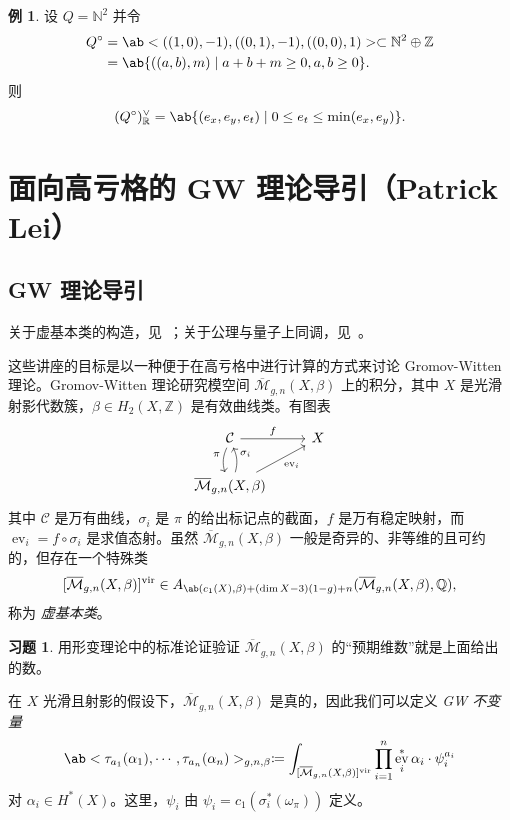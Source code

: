 \documentclass{amsart}
\theoremstyle{definition}
\newtheorem{exm}[thm]{例}
\newtheorem{exer}[thm]{习题}
\theoremstyle{remark}
\theoremstyle{plain}
\theoremstyle{definition}
\theoremstyle{remark}
\newcommand{\N}{\mathbb{N}}
\newcommand{\R}{\mathbb{R}}
\newcommand{\Z}{\mathbb{Z}}
\newcommand{\Q}{\mathbb{Q}}
\newcommand{\Mbar}{\overline{\mathcal{M}}}
\newcommand{\mc}[1]{\mathcal{#1}}
\newcommand{\mr}[1]{\mathrm{#1}}
\newcommand{\on}[1]{\operatorname{#1}}
\newcommand{\1}{\mathbf{1}}
\newcommand{\2}{\mathbf{2}}
\newcommand{\3}{\mathbf{3}}
\newcommand{\vir}{\mr{vir}}
\DeclareMathOperator{\ev}{ev}
\begin{document}
\begin{exm}
    设 \(Q = \N^2\) 并令
    \begin{align*}
        Q^{\circ} &= \ab<((1,0), -1), ((0,1), -1), ((0,0),1)> \subset \N^2 \oplus \Z \\
        &= \ab\{((a,b), m) \mid a+b+m \geq 0, a,b \geq 0 \}.
    \end{align*}
    则
    \[ (Q^{\circ})_{\R}^{\vee} = \ab\{ (e_x, e_y, e_t) \mid 0 \leq e_t \leq \min(e_x, e_y) \}. \]
\end{exm}
\section{面向高亏格的 GW 理论导引（Patrick Lei）}%
\label{sec:Intro to GW theory with a view to higher genus (Patrick Lei)}


\subsection{GW 理论导引}%
\label{sub:Introduction to GW theory}

关于虚基本类的构造，见~\cite{BehrendFantechi1997}；关于公理与量子上同调，见~\cite{KM1994}。

这些讲座的目标是以一种便于在高亏格中进行计算的方式来讨论 Gromov-Witten 理论。Gromov-Witten 理论研究模空间 \(\Mbar_{g,n}(X, \beta)\) 上的积分，其中 \(X\) 是光滑射影代数簇，\(\beta \in H_2(X, \Z)\) 是有效曲线类。有图表
\begin{equation*}
\begin{tikzcd}
    \mc{C} \ar{r}{f} \ar[bend right=20]{d}[swap]{\pi} & X \\
    \Mbar_{g,n}(X, \beta) \ar[bend right=20]{u}[swap]{\sigma_i} \ar{ur}[swap]{\on{ev}_i}
\end{tikzcd}
\end{equation*}
其中 \(\mc{C}\) 是万有曲线，\(\sigma_i\) 是 \(\pi\) 的给出标记点的截面，\(f\) 是万有稳定映射，而 \(\ev_i = f \circ \sigma_i\) 是求值态射。虽然 \(\Mbar_{g,n}(X, \beta)\) 一般是奇异的、非等维的且可约的，但存在一个特殊类
\[ [\Mbar_{g,n}(X, \beta)]^{\vir} \in A_{\ab(c_1(X), \beta) + (\dim X - 3)(1-g) + n}(\Mbar_{g,n}(X, \beta), \Q), \]
称为 \textit{虚基本类}。

\begin{exer}
    用形变理论中的标准论证验证 \(\Mbar_{g,n}(X, \beta)\) 的“预期维数”就是上面给出的数。
\end{exer}

在 \(X\) 光滑且射影的假设下，\(\Mbar_{g,n}(X, \beta)\) 是真的，因此我们可以定义 \textit{GW 不变量}
\[ \ab<\tau_{a_1}(\alpha_1), \cdots, \tau_{a_n}(\alpha_n)>_{g,n,\beta} \coloneqq \int_{[\Mbar_{g,n}(X, \beta)]^{\vir}} \prod_{i=1}^n \ev_i^* \alpha_i \cdot \psi_i^{a_i} \]
对 \(\alpha_i \in H^*(X)\)。这里，\(\psi_i\) 由 \(\psi_i = c_1(\sigma_i^*(\omega_{\pi}))\) 定义。
\end{document}
